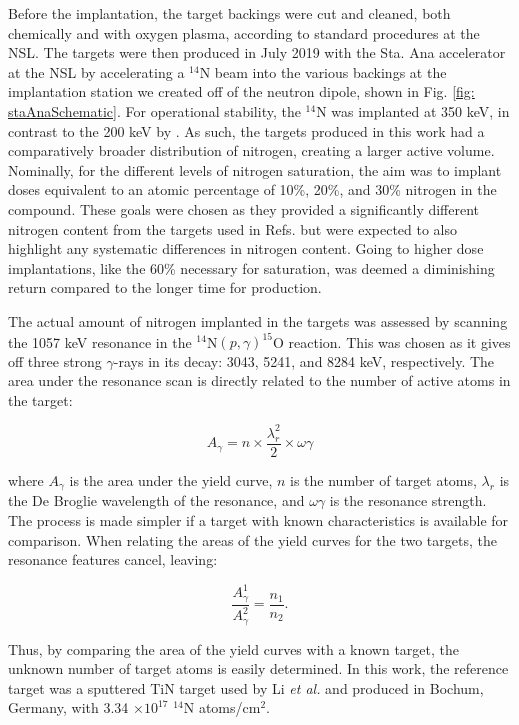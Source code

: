 Before the implantation, the target backings were cut and cleaned, both chemically and with oxygen plasma, according to standard procedures at the NSL. The targets were then produced in July 2019 with the Sta. Ana accelerator at the NSL by accelerating a $^{14}$N beam into the various backings at the implantation station we created off of the neutron dipole, shown in Fig. \ref{fig: staAnaSchematic}. For operational stability, the $^{14}$N was implanted at 350 keV, in contrast to the 200 keV by \cite{Seuthe1987}. As such, the targets produced in this work had a comparatively broader distribution of nitrogen, creating a larger active volume. Nominally, for the different levels of nitrogen saturation, the aim was to implant doses equivalent to an atomic percentage of 10\%, 20\%, and 30\% nitrogen in the compound. These goals were chosen as they provided a significantly different nitrogen content from the targets used in Refs. \cite{Bertone2001, Schurmann2008} but were expected to also highlight any systematic differences in nitrogen content. Going to higher dose implantations, like the 60\% necessary for saturation, was deemed a diminishing return compared to the longer time for production.

The actual amount of nitrogen implanted in the targets was assessed by scanning the 1057 keV resonance in the $^{14}$N$\left( p,\gamma \right) ^{15}$O reaction. This was chosen as it gives off three strong $\gamma$-rays in its decay: 3043, 5241, and 8284 keV, respectively. The area under the resonance scan is directly related to the number of active atoms in the target:

\begin{equation}
A_{\gamma} = n \times \dfrac{\lambda_{r}^{2}}{2} \times \omega\gamma
\label{eqn: targetYield}
\end{equation}

\noindent where $A_{\gamma}$ is the area under the yield curve, $n$ is the number of target atoms, $\lambda_{r}$ is the De Broglie wavelength of the resonance, and $\omega\gamma$ is the resonance strength. The process is made simpler if a target with known characteristics is available for comparison. When relating the areas of the yield curves for the two targets, the resonance features cancel, leaving:

\begin{equation}
\dfrac{A_{\gamma}^{1}}{A_{\gamma}^{2}} = \dfrac{n_{1}}{n_{2}}.
\end{equation}

\noindent Thus, by comparing the area of the yield curves with a known target, the unknown number of target atoms is easily determined. In this work, the reference target was a sputtered TiN target used by Li \textit{et al.} \cite{Li2016} and produced in Bochum, Germany, with 3.34 $\times 10^{17}$ $^{14}$N atoms/cm$^{2}$. 

